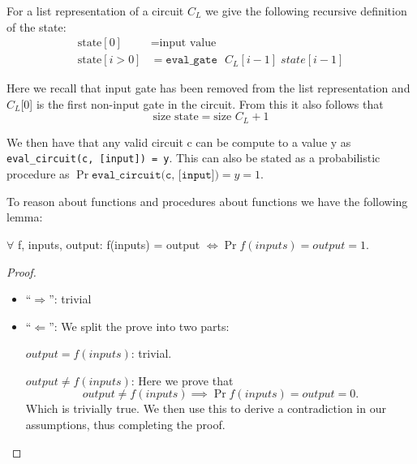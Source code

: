 \begin{definition}
  For a list representation of a circuit $C_{L}$ we give the following recursive
  definition of the state:
  \begin{align*}
    \text{state}[0] &= \text{input value} \\
    \text{state}[i>0] &= \texttt{eval\_{gate} } C_{L}[i-1] \; state[i-1]
  \end{align*}

  Here we recall that input gate has been removed from the list representation
  and $C_{L}$[0] is the first non-input gate in the circuit. From this it also
  follows that
  \begin{equation}
    \text{size } \text{state} = \text{size } C_{L} + 1
  \end{equation}
\end{definition}

We then have that any valid circuit c can be compute to a value y as
\texttt{eval\_circuit(c, [input]) = y}. This can also be stated as a probabilistic
procedure as $\Pr{\texttt{eval\_circuit(c, [input])} = y} = 1$.

To reason about functions and procedures about functions we have the following lemma:
\begin{lemma}
  \label{lem:func/proc-equiv}
  $\forall$ f, inputs, output: f(inputs) = output $\iff \Pr{f(inputs) = output} = 1$.
\end{lemma}
\begin{proof}
  \hspace{2mm}
  \begin{itemize}
    \item  ``$\Rightarrow$'': trivial
    \item  ``$\Leftarrow$'':
      We split the prove into two parts:

      \noindent $output = f(inputs)$: trivial.

      \noindent $output \neq f(inputs)$: Here we prove that
      \[
        output \neq f(inputs) \implies \Pr{f(inputs) = output} = 0.
      \]
      Which is trivially true. We then use this to derive a contradiction in our
      assumptions, thus completing the proof.
  \end{itemize}
\end{proof}




